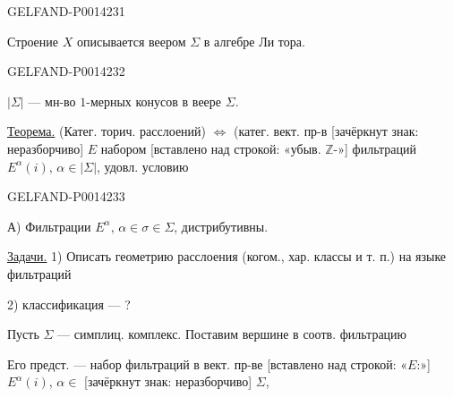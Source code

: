 \begin{GelfandAdjacentEvidence}{GELFAND-P001423}{1}

Строение \(X\) описывается веером \(\Sigma\) в алгебре Ли тора.

\end{GelfandAdjacentEvidence}
\begin{GelfandAdjacentEvidence}{GELFAND-P001423}{2}


\(|\Sigma|\) — мн-во \(1\)-мерных конусов в веере \(\Sigma\).

\uline{Теорема.}
(Катег. торич. расслоений) \(\Longleftrightarrow\)
(катег. вект. пр-в [зачёркнут знак: неразборчиво] \(E\)
набором [вставлено над строкой: «убыв. \(\mathbb Z\)-»]
фильтраций \(E^\alpha(i)\), \(\alpha\in|\Sigma|\), удовл. условию
\end{GelfandAdjacentEvidence}
\begin{GelfandAdjacentEvidence}{GELFAND-P001423}{3}


А) Фильтрации \(E^\alpha\), \(\alpha\in\sigma\in\Sigma\), дистрибутивны.

\uline{Задачи.}
1) Описать геометрию расслоения (когом., хар. классы и т. п.) на языке фильтраций

2) классификация — ?

Пусть \(\Sigma\) — симплиц. комплекс. Поставим вершине в соотв. фильтрацию

Его предст. — набор фильтраций в вект. пр-ве [вставлено над строкой: «\(E\):»] \(E^\alpha(i)\),
\(\alpha\in\) [зачёркнут знак: неразборчиво] \(\Sigma\),
\end{GelfandAdjacentEvidence}
